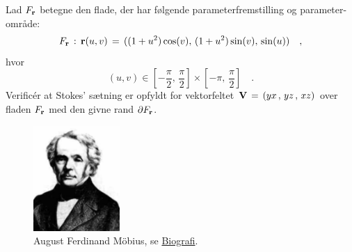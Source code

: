 




\begin{exercise}
Lad $F_{\bf{r}}$ betegne den flade, der har
følgende parameterfremstilling og
parameter-område:
\begin{equation}
F_{\bf{r}}\, : \, {\bf{r}}(u,v)\, = \,
((1+u^2)\cos(v),\, (1+u^2)\sin(v),
\,\sin(u))\quad,
\end{equation}
hvor
\begin{equation}
(u,v)
\in [-\frac{\pi}{2},
\,\frac{\pi}{2}]\times[-\pi,\, \frac{\pi}{2}]
\quad .
\end{equation}
Verific\'{e}r at Stokes' sætning er opfyldt for
vektorfeltet ${\bf{V}}\, = \, (yx\,, \,yz\,,
\,xz)$ over fladen $F_{\bf{r}}$ med den givne
rand $\partial F_{\bf{r}}$.
\end{exercise}


\begin{figure}[h]
\centerline{\includegraphics[height=40mm]{FIGS/PERSMobius1790-1868}}
\begin{center}
\caption{\small{August Ferdinand M\"{o}bius, se \href{http://www-history.mcs.st-and.ac.uk/Mathematicians/Mobius.html}{Biografi}.}}
\label{figPERSMob}
\end{center}
\end{figure}




